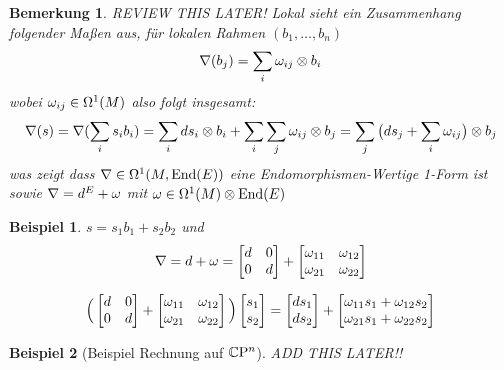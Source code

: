 \documentclass{report}
\newtheorem*{Bem}{Bemerkung}
\newtheorem*{Ex}{Beispiel}
\begin{document}
\begin{Bem}
    REVIEW THIS LATER!
    Lokal sieht ein Zusammenhang folgender Maßen aus, für lokalen Rahmen $(b_1,\ldots,b_n)$
    $$\nabla(b_j) = \sum_i \omega_{ij} \otimes b_{i}$$
    wobei $\omega_{ij} \in \Omega^1(M)$
    also folgt insgesamt:
    $$\nabla(s) = \nabla( \sum_i s_i b_i) = \sum_i ds_i \otimes b_i + \sum_i\sum_j \omega_{ij} \otimes b_j 
     =  \sum_j \big(ds_j + \sum_i \omega_{ij}\big) \otimes b_j  $$
    was zeigt dass $\nabla \in \Omega^1(M,\operatorname{End}(E))$ eine Endomorphismen-Wertige 1-Form ist sowie 
    $\nabla = d^E + \omega$ mit $\omega \in \Omega^1(M) \otimes \operatorname{End}(E)$
\end{Bem}

\begin{Ex}
    $s = s_1 b_1 + s_2 b_2$ und
    $$\nabla = d + \omega = 
    \begin{bmatrix}
        d & 0 \\
        0 & d
    \end{bmatrix} +
    \begin{bmatrix}
        \omega_{11} & \omega_{12} \\
        \omega_{21} & \omega_{22}
    \end{bmatrix} $$

    $$\Big( 
    \begin{bmatrix}
        d & 0 \\
        0 & d
    \end{bmatrix} +
    \begin{bmatrix}
        \omega_{11} & \omega_{12} \\
        \omega_{21} & \omega_{22}
    \end{bmatrix} \Big)
    \begin{bmatrix}
        s_1 \\
        s_2
    \end{bmatrix} 
    = \begin{bmatrix}
        ds_1  \\
        ds_2 
    \end{bmatrix}
    +
    \begin{bmatrix}
    \omega_{11}s_1 + \omega_{12}s_2 \\
    \omega_{21}s_1 + \omega_{22}s_2
    \end{bmatrix}$$

\end{Ex}

\begin{Ex}[Beispiel Rechnung auf $\mathbb{C}\mathrm{P}^{ n }$]

    ADD THIS LATER!!
    
\end{Ex}
\end{document}
